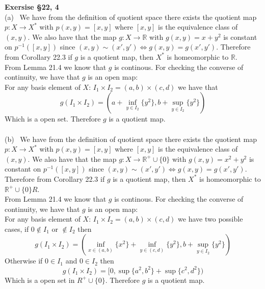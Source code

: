 \documentclass[12pt]{article}
\newenvironment{ques}[1]{\textbf{Exersise #1}\vspace{1 mm}\\ }{\bigskip}
\theoremstyle{definition}
\newcommand{\R}{\mathbb R}
\begin{document}
\begin{ques}{\S 22, 4}
	(a) \ We have from the definition of quotient space there exists the quotient map
	$p:X \to X^*$ with $p(x,y) = [x,y]$ where $[x,y]$
	is the equivalence class of $(x,y)$. We also have that the map $g:X \to \R$
	with $g(x,y) = x + y^2$ is constant on $p^{-1}([x,y])$ since $(x,y) \sim (x',y')
	\Leftrightarrow g(x,y) = g(x',y')$. Therefore from Corollary 22.3 if $g$ is
	a quotient map, then $X^*$ is homeomorphic to $\R$.\\
	From Lemma 21.4 we know that $g$ is continous. For
	checking the converse of continuity, we have that $g$ is an open map:\\
	For any basis element of $X$: $I_1 \times I_2 = (a,b) \times (c,d)$ we have that 
	$$g(I_1 \times I_2) = (a + \inf_{y \in I_2}\{ y^2\}, b + \sup_{y \in I_2}\{y^2\})$$
	Which is a open set. Therefore $g$ is a quotient map. \\
	\\
	(b) \ We have from the definition of quotient space there exists the quotient map
	$p:X \to X^*$ with $p(x,y) = [x,y]$ where $[x,y]$
	is the equivalence class of $(x,y)$. We also have that the map $g:X \to
	\R^+ \cup \{0\}$ with $g(x,y) = x^2 + y^2$ is constant on $p^{-1}([x,y])$
	since $(x,y) \sim (x',y') \Leftrightarrow g(x,y) = g(x',y')$. Therefore
	from Corollary 22.3 if $g$ is a quotient map, then $X^*$ is homeomorphic to
	$\R^+ \cup \{0\}R$.\\
	From Lemma 21.4 we know that $g$ is continous. For
	checking the converse of continuity, we have that $g$ is an open map:\\
	For any basis element of $X$: $I_1 \times I_2 = (a,b) \times (c,d)$ we have
	two possible cases, if $0 \notin I_1$ or $\notin I_2$ then 
	$$g(I_1 \times I_2) = (\inf_{x \in (a,b)} \{x^2\} + \inf_{y \in (c,d)}
	\{y^2\}, b + \sup_{y \in I_2}\{y^2\})$$
	Otherwise if $0 \in I_1$ and $0 \in I_2$ then 
	$$g(I_1 \times I_2) = [0, \sup\{a^2, b^2\} + \sup\{c^2, d^2\})$$
	Which is a open set in $R^+ \cup \{0\}$. Therefore $g$ is a quotient map. \\
	
\end{ques}
\end{document}
